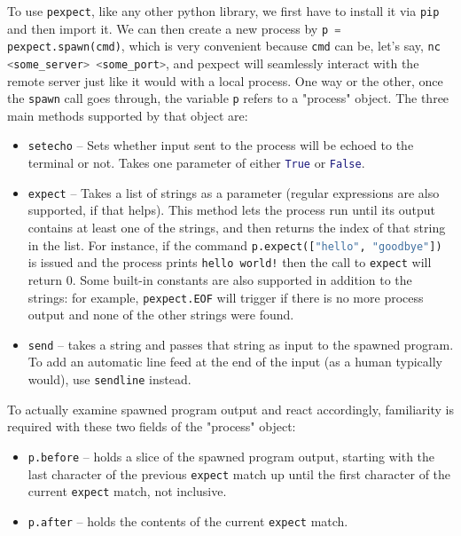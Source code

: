 \documentclass{article}
\newcommand{\xcode}[2]{\colorbox{ubuntuback}{\lstinline[language=#1]|#2|}}
\begin{document}
To use \xcode{python}{pexpect}, like any other python library, we first have to install it via \xcode{bash}{pip} and then import it. We can then create a new process by \xcode{python}{p = pexpect.spawn(cmd)}, which is very convenient because \xcode{python}{cmd} can be, let's say, \xcode{python}{nc <some_server> <some_port>}, and pexpect will seamlessly interact with the remote server just like it would with a local process. One way or the other, once the \xcode{python}{spawn} call goes through, the variable \xcode{python}{p} refers to a "process" object. The three main methods supported by that object are:

\begin{itemize}
    \item \xcode{python}{setecho} -- Sets whether input sent to the process will be echoed to the terminal or not. Takes one parameter of either \xcode{python}{True} or \xcode{python}{False}.
    \item \xcode{python}{expect} -- Takes a list of strings as a parameter (regular expressions are also supported, if that helps). This method lets the process run until its output contains at least one of the strings, and then returns the index of that string in the list. For instance, if the command \xcode{python}{p.expect(["hello", "goodbye"])} is issued and the process prints \xcode{bash}{hello world!} then the call to \xcode{python}{expect} will return 0. Some built-in constants are also supported in addition to the strings: for example, \xcode{python}{pexpect.EOF} will trigger if there is no more process output and none of the other strings were found.

    \item \xcode{python}{send} -- takes a string and passes that string as input to the spawned program. To add an automatic line feed at the end of the input (as a human typically would), use \xcode{python}{sendline} instead.
\end{itemize}

To actually examine spawned program output and react accordingly, familiarity is required with these two fields of the "process" object:
\begin{itemize}
    \item \xcode{python}{p.before} -- holds a slice of the spawned program output, starting with the last character of the previous \xcode{python}{expect} match up until the first character of the current \xcode{python}{expect} match, not inclusive.        
    \item \xcode{python}{p.after} -- holds the contents of the current \xcode{python}{expect} match.
\end{itemize}
\end{document}
